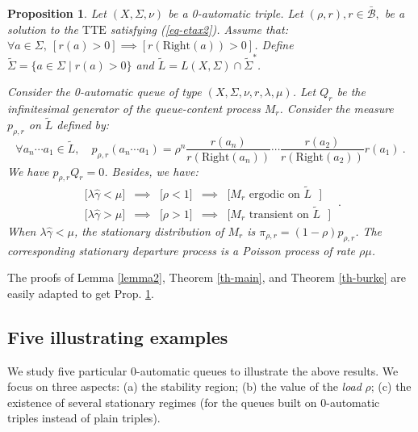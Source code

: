 \documentclass[11pt,a4paper]{article}
\newtheorem{proposition}[theorem]{Proposition}
\theoremstyle{remark}
\def\rightt{\text{Right}}
\def\closcb{\bar{\cB}}
\def\cB{{\mathcal B}}
\def\eref#1{(\ref{#1})}
\begin{document}
\begin{proposition}\label{pr-bis}
Let $(X,\Sigma,\nu)$ be a 0-automatic triple.
Let $(\rho,r), r\in \closcb,$ be a solution to the
$\text{TTE}$ satisfying \eref{eq-etax2}. Assume that: $\forall a \in
\Sigma, \ [
  r(a)>0] \implies [ r(\rightt(a))>0 ]$. Define
$\widetilde{\Sigma} = \{a\in \Sigma \mid r(a) >0\}$ and
$\widetilde{L}= L(X,\Sigma)\cap \widetilde{\Sigma}^*$.

Consider the 0-automatic queue of type
$(X,\Sigma,\nu,r,\lambda,\mu)$. Let $Q_r$ be the infinitesimal generator
of the queue-content process $M_r$.
Consider the measure $p_{\rho,r}$ on $\widetilde{L}$ defined by:
\begin{equation}\label{eq-pxbis}
\forall a_n\cdots a_1\in \widetilde{L}, \quad p_{\rho,r}(a_n\cdots a_1) =
\rho^n \frac{r(a_n)}{r(\rightt(a_n))}\cdots \frac{r(a_{2})}{r(\rightt(a_{2}))}
    r(a_1) \:.
\end{equation}
We have $p_{\rho,r} Q_r=0$. Besides, we have:
\begin{equation*}
\begin{array}{ccccc}
\bigl[ \lambda\widehat{\gamma} < \mu
  \bigr] & \implies & \bigl[ \rho < 1 \bigr] & \implies &
\bigl[ M_r \text{ ergodic on $\widetilde{L}$ } ] \\
\bigl[ \lambda\widehat{\gamma} > \mu
  \bigr] & \implies & \bigl[ \rho > 1
  \bigr] & \implies & \bigl[ M_r \text{ transient on $\widetilde{L}$ }  ]
\end{array}\:.
\end{equation*}
When $\lambda \widehat{\gamma}<\mu$, the stationary distribution of
$M_r$ is $\pi_{\rho,r} = (1-\rho) p_{\rho,r}$. The corresponding
stationary departure process is a Poisson process of rate $\rho\mu$.
\end{proposition}

The proofs of Lemma \ref{lemma2}, Theorem \ref{th-main}, and Theorem
\ref{th-burke} are easily
adapted to get Prop. \ref{pr-bis}.


\subsection{Five illustrating examples}\label{sse-5}

We study five particular 0-automatic queues to illustrate the
above results. We focus on three aspects: (a) the stability
region; (b) the value of the {\em load} $\rho$; (c) the existence
of several stationary regimes (for the queues built on 0-automatic
triples instead of plain triples). 
\end{document}
